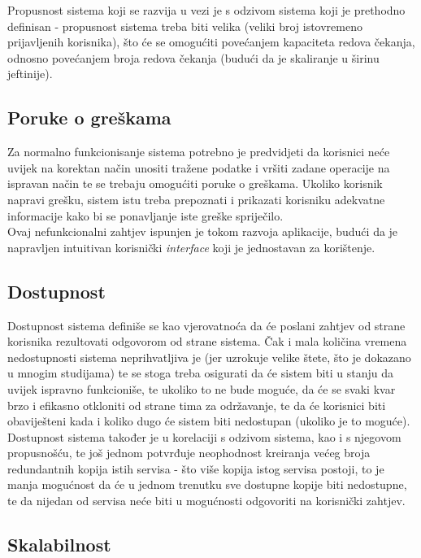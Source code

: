 \documentclass[12pt,a4paper]{article}
\begin{document}
Propusnost sistema koji se razvija u vezi je s odzivom sistema koji je prethodno definisan - propusnost sistema treba biti velika (veliki broj istovremeno prijavljenih korisnika), što će se omogućiti povećanjem kapaciteta redova čekanja, odnosno povećanjem broja redova čekanja (budući da je skaliranje u širinu jeftinije).

\subsection{Poruke o greškama}

\quad Za normalno funkcionisanje sistema potrebno je predvidjeti da korisnici neće uvijek na korektan način unositi tražene podatke i vršiti zadane operacije na ispravan način te se trebaju omogućiti poruke o greškama. Ukoliko korisnik napravi grešku, sistem istu treba prepoznati i prikazati korisniku adekvatne informacije kako bi se ponavljanje iste greške spriječilo. \\

Ovaj nefunkcionalni zahtjev ispunjen je tokom razvoja aplikacije, budući da je napravljen intuitivan korisnički \textit{interface} koji je jednostavan za korištenje.

\subsection{Dostupnost}

\quad Dostupnost sistema definiše se kao vjerovatnoća da će poslani zahtjev od strane korisnika rezultovati odgovorom od strane sistema. Čak i mala količina vremena nedostupnosti sistema neprihvatljiva je (jer uzrokuje velike štete, što je dokazano u mnogim studijama) te se stoga treba osigurati da će sistem biti u stanju da uvijek ispravno funkcioniše, te ukoliko to ne bude moguće, da će se svaki kvar brzo i efikasno otkloniti od strane tima za održavanje, te da će korisnici biti obaviješteni kada i koliko dugo će sistem biti nedostupan (ukoliko je to moguće). \\

Dostupnost sistema također je u korelaciji s odzivom sistema, kao i s njegovom propusnošću, te još jednom potvrđuje neophodnost kreiranja većeg broja redundantnih kopija istih servisa - što više kopija istog servisa postoji, to je manja mogućnost da će u jednom trenutku sve dostupne kopije biti nedostupne, te da nijedan od servisa neće biti u mogućnosti odgovoriti na korisnički zahtjev.

\subsection{Skalabilnost}
\end{document}
